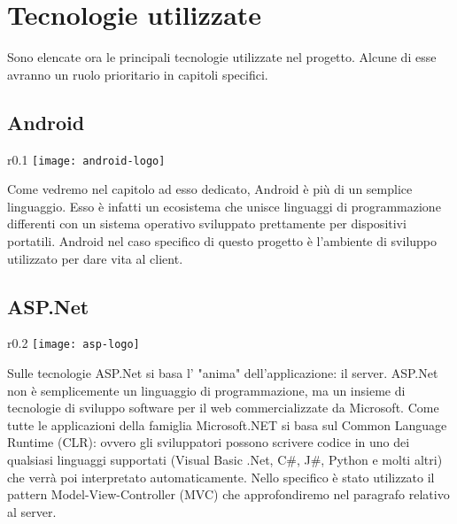\chapter{Tecnologie utilizzate}
Sono elencate ora le principali tecnologie utilizzate nel progetto. Alcune di esse avranno un ruolo prioritario in capitoli specifici.

\section{Android}
\begin{wrapfigure}{r}{0.1\textwidth}
\texttt{[image: android-logo]}
\end{wrapfigure} 
\FloatBarrier
Come vedremo nel capitolo ad esso dedicato, Android è più di un semplice linguaggio. Esso è infatti un ecosistema che unisce linguaggi di programmazione differenti con un sistema operativo sviluppato prettamente per dispositivi portatili.
Android nel caso specifico di questo progetto è l'ambiente di sviluppo utilizzato per dare vita al client.

\section{ASP.Net}
\begin{wrapfigure}{r}{0.2\textwidth}
\texttt{[image: asp-logo]}
\end{wrapfigure} 
\FloatBarrier
Sulle tecnologie ASP.Net si basa l' "anima" dell'applicazione: il server.
ASP.Net non è semplicemente un linguaggio di programmazione, ma un insieme di tecnologie di sviluppo software per il web commercializzate da Microsoft.
Come tutte le applicazioni della famiglia Microsoft.NET si basa sul Common Language Runtime (CLR): ovvero gli sviluppatori possono scrivere codice in uno dei qualsiasi linguaggi supportati (Visual Basic .Net, C\#, J\#, Python e molti altri) che verrà poi interpretato automaticamente.
Nello specifico è stato utilizzato il pattern Model-View-Controller (MVC) che approfondiremo nel paragrafo relativo al server.

